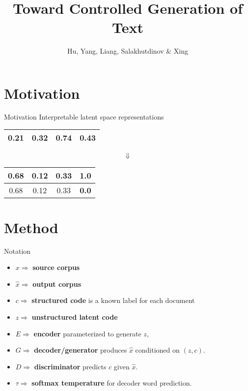 \documentclass{beamer}
\title{Toward Controlled Generation of Text}
\date{}
\author{Hu, Yang, Liang, Salakhutdinov \& Xing}
\institute{ICML 2017}
\begin{document}
\maketitle

\section{Motivation}
\begin{frame}{Motivation}
  Interpretable latent space representations
  \begin{center}
    \begin{tabular}{ | c | c | c | c | }
      \hline
      0.21 & 0.32 & 0.74 & 0.43 \\  
      \hline
    \end{tabular}
    {\Huge$$\Downarrow$$}
    \begin{tabular}{ | c | c | c | c | }
      \hline
      0.68 & 0.12 & 0.33 & {\color{red}\textbf{1.0}} \\  
      \hline
      \hline
      0.68 & 0.12 & 0.33 & {\color{red}\textbf{0.0}} \\  
      \hline
    \end{tabular}
  \end{center}
\end{frame}

\section{Method}
\begin{frame}{Notation}
  \begin{itemize}
    \item $x \Rightarrow$ \textbf{source corpus}
    \item $\hat{x} \Rightarrow$ \textbf{output corpus}
    \item $c \Rightarrow$ \textbf{structured code} is a known label for each document
    \item $z \Rightarrow$ \textbf{unstructured latent code}
    \item $E \Rightarrow$ \textbf{encoder} parameterized to generate $z$, 
    \item $G \Rightarrow$ \textbf{decoder/generator} produces $\hat{x}$ conditioned on $(z, c)$.
    \item $D \Rightarrow$ \textbf{discriminator} predicts $c$ given $\hat{x}$.
    \item $\tau \Rightarrow$ \textbf{softmax temperature} for decoder word prediction.
  \end{itemize}
\end{frame}
\end{document}
